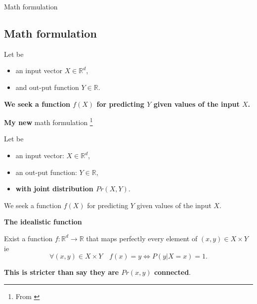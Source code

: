 \begin{frame}{Math formulation}
  \subsection{Math formulation}
    Let be
    \begin{itemize}
        \item an input vector $X \in \mathbb{R}^d$, 
        \item and out-put function $Y \in \mathbb{R}$.
    \end{itemize}
    
    \textbf{ 
      We seek a function $f(X)$ for predicting $Y$ given values of the input $X$.
      }
\end{frame}
\begin{frame}{\textbf{My new} math formulation \footnote{ From \cite{HastieStatisticalLearing}}}
  
  Let be
    \begin{itemize}
        \item an input vector: $X \in \mathbb{R}^d$, 
        \item an out-put function: $Y \in \mathbb{R}$,
        \item  \textbf{with joint distribution $Pr(X,Y)$}.
    \end{itemize}
    
      We seek a function $f(X)$ for predicting $Y$ given values of the input $X$.

      \pause 
      \begin{theorem}{\textbf{The idealistic function}}  

      Exist a function $f: \mathbb{R}^d \longrightarrow \mathbb{R}$ that maps perfectly 
      every element of $(x,y) \in X \times Y$ ie 
      \begin{equation}
        \forall (x,y) \in X \times Y 
        \quad
        f(x) = y 
        \Longleftrightarrow
        P(y |X=x) = 1.
      \end{equation}
    \end{theorem} 
      \textbf{This is stricter than say they are $Pr(x,y)$ connected}.
    \end{frame}

    